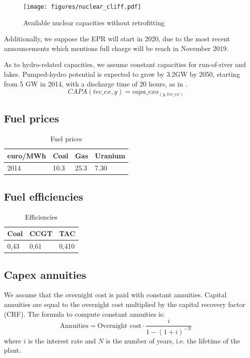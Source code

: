 \documentclass[authoryear]{elsarticle}
\begin{document}
\begin{figure}[!ht]
	\centering
	\texttt{[image: figures/nuclear\_cliff.pdf]}
	\caption{Available nuclear capacities without retrofitting}
	\label{fig:nuclear_cliff}
\end{figure}

Additionally, we suppose the EPR will start in 2020, due to the most recent announcements which mentions full charge will be reach in November 2019.

As to hydro-related capacities, we assume constant capacities for run-of-river and lakes. Pumped-hydro potential is expected to grow by 3.2GW by 2050, starting from 5 GW in 2014, with a discharge time of 20 hours, as in \citet{ADEME2013}.
$$CAPA(tec\_ex,y) = capa\_exo_(y,tec\_ex) $$

\subsection{Fuel prices}

\begin{table}[!ht]
	\centering
	\caption{Fuel prices}
	\label{tab:Fuel_prices}
	\begin{tabular}{llll}
		\toprule
		euro/MWh & Coal & Gas & Uranium \\
		\midrule
		2014 & 10.3 & 25.3 & 7.30 \\
		\bottomrule
	\end{tabular}
\end{table}

\subsection{Fuel efficiencies}

\begin{table}[!h]
	\centering
	\caption{Efficiencies}
	\label{tab:Efficiencies}
	\begin{tabular}{lll}
		\toprule
		Coal & CCGT & TAC \\
		\midrule
		0,43 & 0,61 & 0,410 \\
		\bottomrule
	\end{tabular}
\end{table}

\subsection{Capex annuities}

We assume that the overnight cost is paid with constant annuities.
Capital annuities are equal to the overnight cost multiplied by the capital recovery factor (CRF). The formula to compute constant annuities is:
$$\text{Annuities} = \text{Overnight cost} \cdot \frac{i}{1 - (1+i)^{-N}} $$
where $i$ is the interest rate and $N$ is the number of years, i.e. the lifetime of the plant.
\end{document}

